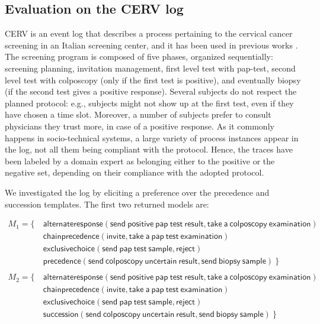 \subsection{Evaluation on the CERV log}
\label{subsec:cerv}

CERV is an event log that describes a process pertaining to the cervical cancer screening in an Italian screening center, and it has been used in previous works \cite{2007b-Lamma,deviant-tkde}. The screening program is composed of five phases, organized sequentially: screening planning, invitation management, first level test with pap-test, second level test with colposcopy (only if the first test is positive), and eventually biopsy (if the second test gives a positive response). Several subjects do not respect the planned protocol: e.g., subjects might not show up at the first test, even if they have chosen a time slot. Moreover, a number of subjects prefer to consult physicians they trust more, in case of a positive response. As it commonly happens in socio-technical systems, a large variety of process instances appear in the log, not all them being compliant with the protocol.
%
Hence, the traces have been labeled by a domain expert as belonging either to the positive or the negative set, depending on their compliance with the adopted protocol.

We investigated the log by eliciting a preference over the \textsf{precedence} and \textsf{succession} templates. The first two returned models are:

\begin{align*}
M_1 = \{ \ &  \mathsf{ alternateresponse(send\ positive\ pap\ test\ result, take\ a\ colposcopy\ examination)} \\
& \mathsf{ chainprecedence(invite, take\ a\ pap\ test\ examination)} \\
& \mathsf{ exclusivechoice(send\ pap\ test\ sample, reject)} \\
& \mathsf{precedence(send\ colposcopy\ uncertain\ result, send\ biopsy\ sample)} \ \}  \\ \\
M_2 = \{ \ &  \mathsf{ alternateresponse(send\ positive\ pap\ test\ result, take\ a\ colposcopy\ examination)} \\
& \mathsf{ chainprecedence(invite, take\ a\ pap\ test\ examination)} \\
& \mathsf{ exclusivechoice(send\ pap\ test\ sample, reject)} \\
& \mathsf{succession(send\ colposcopy\ uncertain\ result, send\ biopsy\ sample)} \ \}  
\end{align*}

